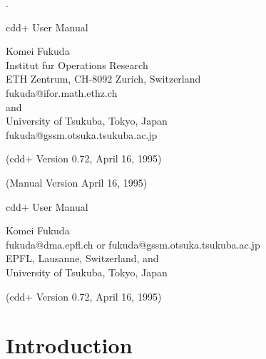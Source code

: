 %
\renewcommand{\baselinestretch}{1.0}
\setlength{\oddsidemargin}{8mm}
\setlength{\textwidth}{16cm}
\setlength{\topmargin}{0mm}
\setlength{\textheight}{23cm}
\setlength{\headsep}{0in}
\setlength{\headheight}{0pt}

\pagestyle{empty}



.\vspace{20mm}

\begin{center}

\vspace{20mm}

{\LARGE cdd+ User Manual}

\vspace{20mm}

{\Large Komei Fukuda\\
   Institut fur Operations Research\\ 
   ETH Zentrum, CH-8092 Zurich, Switzerland\\  
    fukuda@ifor.math.ethz.ch\\
  and\\
   University of Tsukuba, Tokyo, Japan\\
  fukuda@gssm.otsuka.tsukuba.ac.jp
}

\vspace{20mm}
{\Large (cdd+ Version 0.72,  April 16, 1995)}

{\Large (Manual  Version  April 16, 1995)}

\end{center}

\newpage
\pagestyle{plain}
\setcounter{page}{1} 

\begin{center}

{\Large cdd+ User Manual}

\bigskip
{\large Komei Fukuda\\
   fukuda@dma.epfl.ch  or  fukuda@gssm.otsuka.tsukuba.ac.jp\\
   EPFL, Lausanne, Switzerland, and\\
   University of Tsukuba, Tokyo, Japan}

\bigskip
{\large (cdd+ Version 0.72,  April 16, 1995)}

\end{center}

\section{Introduction} \label{INTRODUCTION}

